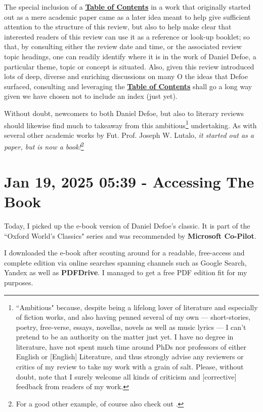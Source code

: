 \documentclass[a4paper]{article}
\begin{document}
The special inclusion of a \textbf{\hyperref[SECTOC]{Table of Contents}} in a work that originally started out as a mere academic paper came as a later idea meant to help give sufficient attention to the structure of this review, but also to help make clear that interested readers of this review can use it as a reference or look-up booklet; so that, by consulting either the review date and time, or the associated review topic headings, one can readily identify where it is in the work of Daniel Defoe, a particular theme, topic or concept is situated. Also, given this review introduced lots of deep, diverse and enriching discussions on many O the ideas that Defoe surfaced, consulting and leveraging the \textbf{\hyperref[SECTOC]{Table of Contents}} shall go a long way given we have chosen not to include an index (just yet).

Without doubt, newcomers to both Daniel Defoe, but also to literary reviews should likewise find much to takeaway from this ambitious\footnote{``Ambitious" because, despite being a lifelong lover of literature and especially of fiction works, and also having penned several of my own --- short-stories, poetry, free-verse, essays, novellas, novels as well as music lyrics --- I can't pretend to be an authority on the matter just yet. I have no degree in literature, have not spent much time around PhDs nor professors of either English or [English] Literature, and thus strongly advise any reviewers or critics of my review to take my work with a grain of salt. Please, without doubt, note that I surely welcome all kinds of criticism and [corrective] feedback from readers of my work.} undertaking. As with several other academic works by Fut. Prof. Joseph W. Lutalo, \textit{it started out as a paper, but is now a book!}\footnote{For a good other example, of course also check out \cite{lutalo_2025_grimlumtauto}.}


\section{Jan 19, 2025 05:39 - Accessing The Book}
\label{SEC1}


Today, I picked up the e-book version of Daniel Defoe's classic. It is part of the ``Oxford World's Classics" series and was recommended by \textbf{Microsoft Co-Pilot}. 

I downloaded the e-book after scouting around for a readable, free-access and complete edition via online searches spanning channels such as Google Search, Yandex as well as \textbf{PDFDrive}. I managed to get a free PDF edition fit for my purposes. 
\end{document}
